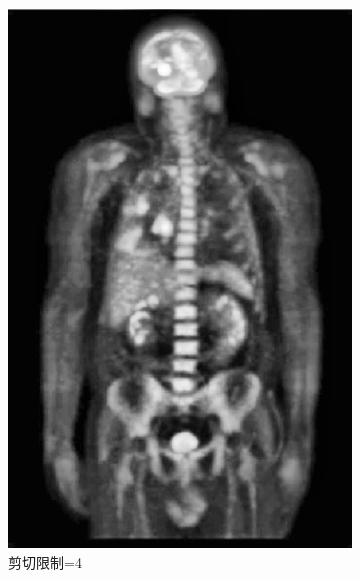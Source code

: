 \documentclass[a4paper]{ctexart}
\newcommand{\outwfour}{0.23\textwidth}
\begin{document}
\begin{spacing}{1.35}
\begin{figure}[htbp]
\begin{subfigure}[t]{\outwfour}
			\includegraphics[width=\textwidth]{figure/2_clip_limit_4.png}
			\caption{剪切限制=4}
		\end{subfigure}
		\begin{subfigure}[t]{\outwfour}
			\centering

\end{subfigure}
\end{figure}
\end{spacing}
\end{document}
